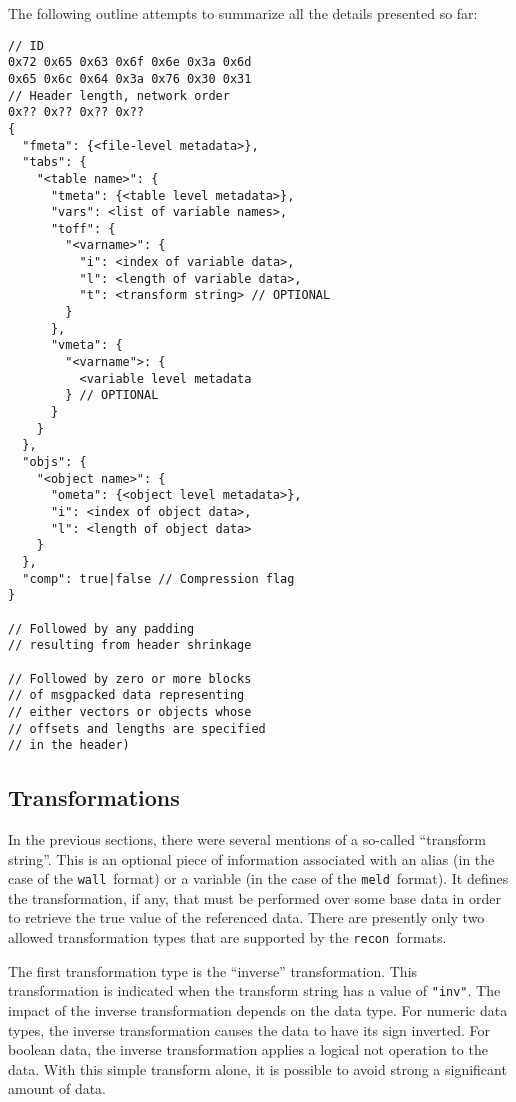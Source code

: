 \documentclass[11pt,a4paper,twocolumn]{article}
\newcommand{\recon}{\texttt{recon}}
\newcommand{\wall}{\texttt{wall}}
\newcommand{\meld}{\texttt{meld}}
\newcommand{\code}[1]{\texttt{#1}} %
\begin{document}
The following outline attempts to summarize all the details presented so
far:

\begin{verbatim}
// ID
0x72 0x65 0x63 0x6f 0x6e 0x3a 0x6d
0x65 0x6c 0x64 0x3a 0x76 0x30 0x31
// Header length, network order
0x?? 0x?? 0x?? 0x??
{
  "fmeta": {<file-level metadata>},
  "tabs": {
    "<table name>": {
      "tmeta": {<table level metadata>},
      "vars": <list of variable names>,
      "toff": {
        "<varname>": {
          "i": <index of variable data>,
          "l": <length of variable data>,
          "t": <transform string> // OPTIONAL
        }
      },
      "vmeta": {
        "<varname">: {
          <variable level metadata
        } // OPTIONAL
      }
    }
  },
  "objs": {
    "<object name>": {
      "ometa": {<object level metadata>},
      "i": <index of object data>,
      "l": <length of object data>
    }
  },
  "comp": true|false // Compression flag
}

// Followed by any padding
// resulting from header shrinkage

// Followed by zero or more blocks
// of msgpacked data representing
// either vectors or objects whose
// offsets and lengths are specified
// in the header)
\end{verbatim}

\subsection{Transformations}
\label{sec:trans}


In the previous sections, there were several mentions of a so-called
``transform string''.  This is an optional piece of information
associated with an alias (in the case of the \wall\ format) or a
variable (in the case of the \meld\ format).  It defines the
transformation, if any, that must be performed over some base data in
order to retrieve the true value of the referenced data.  There are
presently only two allowed transformation types that are supported by
the \recon\ formats.

The first transformation type is the ``inverse'' transformation.  This
transformation is indicated when the transform string has a value of
\code{"inv"}.  The impact of the inverse transformation depends on the
data type.  For numeric data types, the inverse transformation causes
the data to have its sign inverted.  For boolean data, the inverse
transformation applies a logical not operation to the data.  With this
simple transform alone, it is possible to avoid strong a significant
amount of data.
\end{document}
